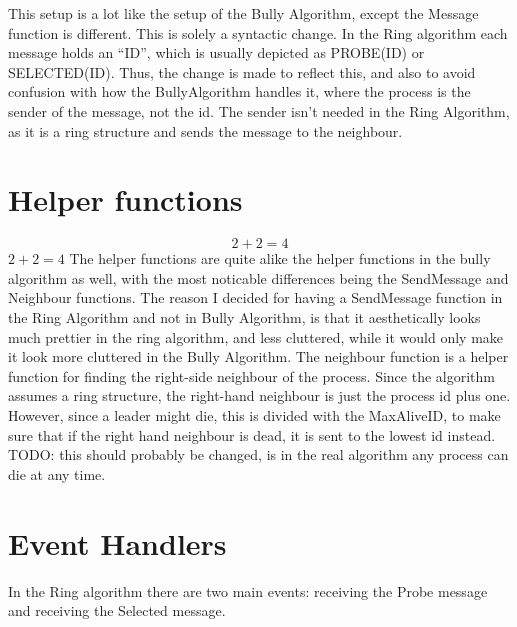 \documentclass{report}
\begin{document}
This setup is a lot like the setup of the Bully Algorithm, except the Message function is different. This is solely a syntactic change. In the Ring algorithm each message holds an ``ID'', which is usually depicted as PROBE(ID) or SELECTED(ID). Thus, the change is made to reflect this, and also to avoid confusion with how the BullyAlgorithm handles it, where the process is the sender of the message, not the id. The sender isn't needed in the Ring Algorithm, as it is a ring structure and sends the message to the neighbour.

\section{Helper functions}
\noindent{}


$$2+2 = 4$$
$2+2=4$
The helper functions are quite alike the helper functions in the bully algorithm as well, with the most noticable differences being the SendMessage and Neighbour functions.
The reason I decided for having a SendMessage function in the Ring Algorithm and not in Bully Algorithm, is that it aesthetically looks much prettier in the ring algorithm, and less cluttered, while it would only make it look more cluttered in the Bully Algorithm.
The neighbour function is a helper function for finding the right-side neighbour of the process. Since the algorithm assumes a ring structure, the right-hand neighbour is just the process id plus one. However, since a leader might die, this is divided with the MaxAliveID, to make sure that if the right hand neighbour is dead, it is sent to the lowest id instead. TODO: this should probably be changed, is in the real algorithm any process can die at any time.

\section{Event Handlers}
In the Ring algorithm there are two main events: receiving the Probe message and receiving the Selected message.

\noindent{}
\end{document}
